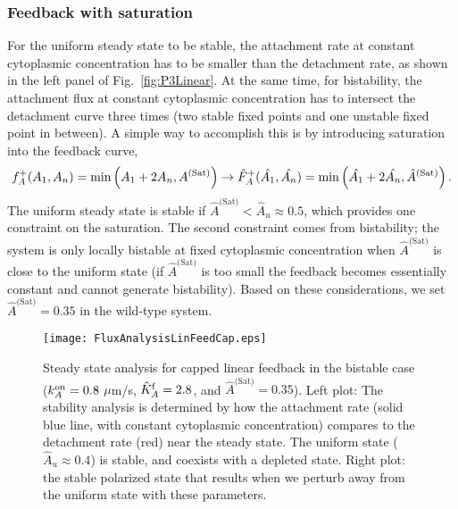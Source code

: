 \documentclass[11pt]{article}
\newcommand{\6}[1]{#1_{\text{6}}}
\newcommand{\3}[1]{#1_{\text{3}}}
\newcommand{\Sat}[1]{#1^\text{(Sat)}}
\begin{document}
\subsubsection{Feedback with saturation}
For the uniform steady state to be stable, the attachment rate at constant cytoplasmic concentration has to be smaller than the detachment rate, as shown in the left panel of Fig.\ \ref{fig:P3Linear}. At the same time, for bistability, the attachment flux at constant cytoplasmic concentration has to intersect the detachment curve three times (two stable fixed points and one unstable fixed point in between). A simple way to accomplish this is by introducing saturation into the feedback curve,
\begin{equation}
f_A^+(\MA,\PA) =\min\left(\MA+2\PA,\Sat{A}\right) \rightarrow \hat F_A^+(\hat \MA, \hat \PA) = \min\left(\hat \MA+2\hat \PA, \Sat{\hat A}\right). 
\end{equation}
The uniform steady state is stable if $\Sat{\hat A} < \hat A_u \approx 0.5$, which provides one constraint on the saturation. The second constraint comes from bistability; the system is only locally bistable at fixed cytoplasmic concentration when $\Sat{\hat A}$ is close to the uniform state (if $\Sat{\hat A}$ is too small the feedback becomes essentially constant and cannot generate bistability). Based on these considerations, we set $\Sat{\hat A}=0.35$ in the wild-type system. 


\begin{figure}
\centering
\texttt{[image: FluxAnalysisLinFeedCap.eps]}
\caption{\label{fig:P3Cap}Steady state analysis for capped linear feedback in the bistable case ($k^\text{on}_A=0.8$ $\mu$m/s, $\hat{K}^\text{f}_A=2.8$, and $\Sat{\hat A}=0.35$). Left plot: The stability analysis is determined by how the attachment rate (solid blue line, with constant cytoplasmic concentration) compares to the detachment rate (red) near the steady state. The uniform state ($\hat A_u \approx 0.4$) is stable, and coexists with a depleted state. Right plot: the stable polarized state that results when we perturb away from the uniform state with these parameters.}
\end{figure}
\end{document}
